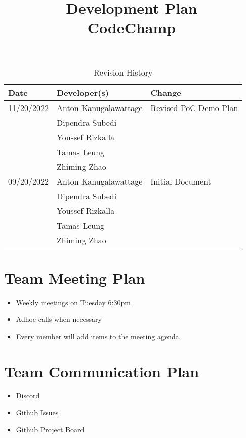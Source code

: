 \documentclass{article}
\title{Development Plan\\CodeChamp}
\author{\authname}
\date{}
\begin{document}
\begin{table}[hp]
\caption{Revision History} \label{TblRevisionHistory}
\begin{tabularx}{\textwidth}{llX}
\toprule
\textbf{Date} & \textbf{Developer(s)} & \textbf{Change}\\
\midrule
11/20/2022 & Anton Kanugalawattage & Revised PoC Demo Plan\\
  & Dipendra Subedi & \\
  & Youssef Rizkalla &\\
  & Tamas Leung & \\
  & Zhiming Zhao & \\
\midrule
09/20/2022 & Anton Kanugalawattage & Initial Document\\
  & Dipendra Subedi & \\
  & Youssef Rizkalla &\\
  & Tamas Leung & \\
  & Zhiming Zhao & \\
\bottomrule
\end{tabularx}
\end{table}

\newpage

\maketitle


\section{Team Meeting Plan}
\begin{itemize}
\item Weekly meetings on Tuesday 6:30pm
\item Adhoc calls when necessary
\item Every member will add items to the meeting agenda
\end{itemize}

\section{Team Communication Plan}
\begin{itemize}
\item Discord
\item Github Issues
\item Github Project Board
\end{itemize}
\end{document}

